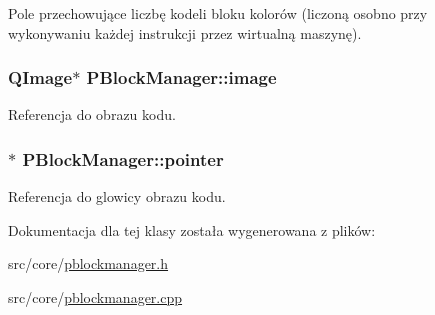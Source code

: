 Pole przechowujące liczbę kodeli bloku kolorów (liczoną osobno przy wykonywaniu każdej instrukcji przez wirtualną maszynę). \hypertarget{classPBlockManager_429ddf44eba8dc97ccd38d67d4b8172f}{
\subsubsection[{image}]{\setlength{\rightskip}{0pt plus 5cm}QImage$\ast$ {\bf PBlockManager::image}}}
\label{classPBlockManager_429ddf44eba8dc97ccd38d67d4b8172f}


Referencja do obrazu kodu. \hypertarget{classPBlockManager_835bfe00bdbea928d1b4ad6212cf733c}{
\subsubsection[{pointer}]{$\ast$ {\bf PBlockManager::pointer}}}
\label{classPBlockManager_835bfe00bdbea928d1b4ad6212cf733c}


Referencja do glowicy obrazu kodu. 

Dokumentacja dla tej klasy została wygenerowana z plików:\begin{CompactItemize}
\item 
src/core/\hyperlink{pblockmanager_8h}{pblockmanager.h}\item 
src/core/\hyperlink{pblockmanager_8cpp}{pblockmanager.cpp}\end{CompactItemize}
